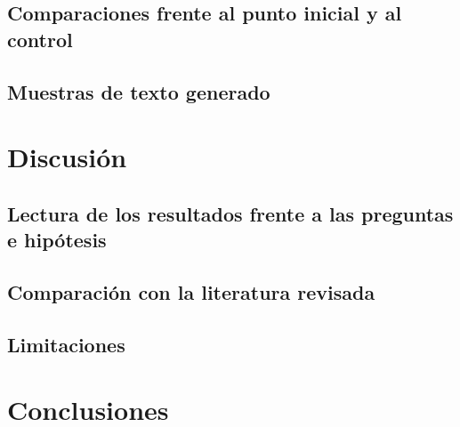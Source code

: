 \subsection{Comparaciones frente al punto inicial y al control}

\subsection{Muestras de texto generado}

\section{Discusión}

\subsection{Lectura de los resultados frente a las preguntas e hipótesis}

\subsection{Comparación con la literatura revisada}

\subsection{Limitaciones}

\section{Conclusiones}
